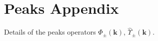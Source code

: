\chapter{Peaks Appendix}
\label{PeaksAppendix}
\graphicspath{{Figures/PeaksAppendix/}}

Details of the peaks operators $\hat{\Phi}_\pm(\mathbf{k})$, $\hat{\Upsilon}_\pm(\mathbf{k})$.